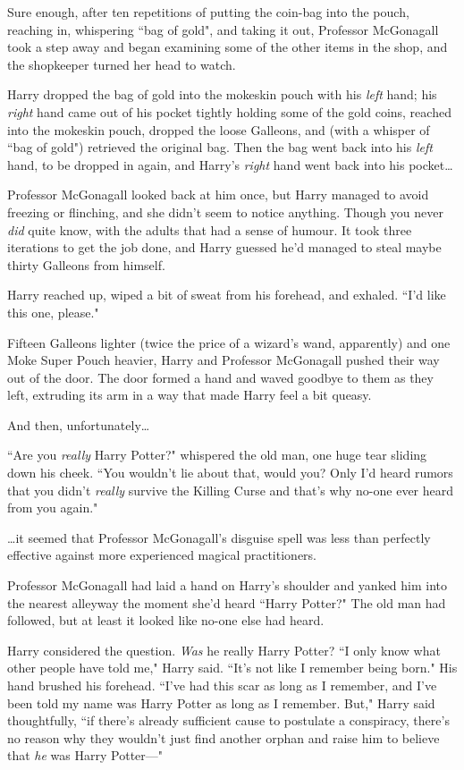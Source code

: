 Sure enough, after ten repetitions of putting the coin-bag into the pouch, reaching in, whispering ``bag of gold", and taking it out, Professor McGonagall took a step away and began examining some of the other items in the shop, and the shopkeeper turned her head to watch.

Harry dropped the bag of gold into the mokeskin pouch with his \emph{left} hand; his \emph{right} hand came out of his pocket tightly holding some of the gold coins, reached into the mokeskin pouch, dropped the loose Galleons, and (with a whisper of ``bag of gold") retrieved the original bag. Then the bag went back into his \emph{left} hand, to be dropped in again, and Harry's \emph{right} hand went back into his pocket{\ldots}

Professor McGonagall looked back at him once, but Harry managed to avoid freezing or flinching, and she didn't seem to notice anything. Though you never \emph{did} quite know, with the adults that had a sense of humour. It took three iterations to get the job done, and Harry guessed he'd managed to steal maybe thirty Galleons from himself.

Harry reached up, wiped a bit of sweat from his forehead, and exhaled. ``I'd like this one, please."

Fifteen Galleons lighter (twice the price of a wizard's wand, apparently) and one Moke Super Pouch  heavier, Harry and Professor McGonagall pushed their way out of the door. The door formed a hand and waved goodbye to them as they left, extruding its arm in a way that made Harry feel a bit queasy.

And then, unfortunately{\ldots}

``Are you \emph{really} Harry Potter?" whispered the old man, one huge tear sliding down his cheek. ``You wouldn't lie about that, would you? Only I'd heard rumors that you didn't \emph{really} survive the Killing Curse and that's why no-one ever heard from you again."

{\ldots}it seemed that Professor McGonagall's disguise spell was less than perfectly effective against more experienced magical practitioners.

Professor McGonagall had laid a hand on Harry's shoulder and yanked him into the nearest alleyway the moment she'd heard ``Harry Potter?" The old man had followed, but at least it looked like no-one else had heard.

Harry considered the question. \emph{Was} he really Harry Potter? ``I only know what other people have told me," Harry said. ``It's not like I remember being born." His hand brushed his forehead. ``I've had this scar as long as I remember, and I've been told my name was Harry Potter as long as I remember. But," Harry said thoughtfully, ``if there's already sufficient cause to postulate a conspiracy, there's no reason why they wouldn't just find another orphan and raise him to believe that \emph{he} was Harry Potter—"

